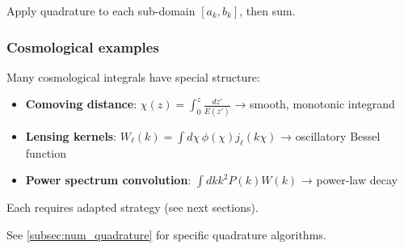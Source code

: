 Apply quadrature to each sub-domain $[a_k, b_k]$, then sum.

\subsubsection{Cosmological examples}

Many cosmological integrals have special structure:

\begin{itemize}
    \item \textbf{Comoving distance}: $\chi(z) = \int_0^z \frac{dz'}{E(z')}$ → smooth, monotonic integrand
    \item \textbf{Lensing kernels}: $W_\ell(k) = \int d\chi \, \phi(\chi) j_\ell(k\chi)$ → oscillatory Bessel function
    \item \textbf{Power spectrum convolution}: $\int dk k^2 P(k) W(k)$ → power-law decay
\end{itemize}

Each requires adapted strategy (see next sections).

See \cref{subsec:num_quadrature} for specific quadrature algorithms.
